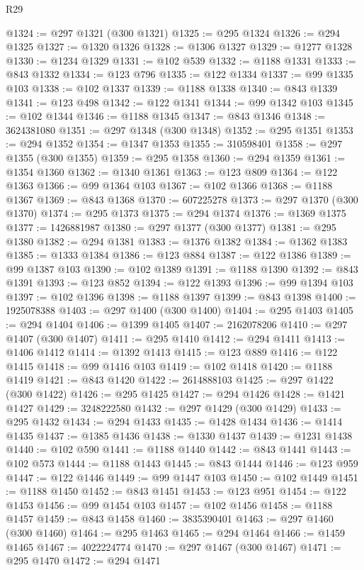 \begin{lexlean}{R29}
\begin{coremodule}
@1324 := @297 @1321 (@300 @1321)
@1325 := @295 @1324
@1326 := @294 @1325
@1327 := @1320 @1326
@1328 := @1306 @1327
@1329 := @1277 @1328
@1330 := @1234 @1329
@1331 := @102 @539
@1332 := @1188 @1331
@1333 := @843 @1332
@1334 := @123 @796
@1335 := @122 @1334
@1337 := @99 @1335 @103
@1338 := @102 @1337
@1339 := @1188 @1338
@1340 := @843 @1339
@1341 := @123 @498
@1342 := @122 @1341
@1344 := @99 @1342 @103
@1345 := @102 @1344
@1346 := @1188 @1345
@1347 := @843 @1346
@1348 := 3624381080
@1351 := @297 @1348 (@300 @1348)
@1352 := @295 @1351
@1353 := @294 @1352
@1354 := @1347 @1353
@1355 := 310598401
@1358 := @297 @1355 (@300 @1355)
@1359 := @295 @1358
@1360 := @294 @1359
@1361 := @1354 @1360
@1362 := @1340 @1361
@1363 := @123 @809
@1364 := @122 @1363
@1366 := @99 @1364 @103
@1367 := @102 @1366
@1368 := @1188 @1367
@1369 := @843 @1368
@1370 := 607225278
@1373 := @297 @1370 (@300 @1370)
@1374 := @295 @1373
@1375 := @294 @1374
@1376 := @1369 @1375
@1377 := 1426881987
@1380 := @297 @1377 (@300 @1377)
@1381 := @295 @1380
@1382 := @294 @1381
@1383 := @1376 @1382
@1384 := @1362 @1383
@1385 := @1333 @1384
@1386 := @123 @884
@1387 := @122 @1386
@1389 := @99 @1387 @103
@1390 := @102 @1389
@1391 := @1188 @1390
@1392 := @843 @1391
@1393 := @123 @852
@1394 := @122 @1393
@1396 := @99 @1394 @103
@1397 := @102 @1396
@1398 := @1188 @1397
@1399 := @843 @1398
@1400 := 1925078388
@1403 := @297 @1400 (@300 @1400)
@1404 := @295 @1403
@1405 := @294 @1404
@1406 := @1399 @1405
@1407 := 2162078206
@1410 := @297 @1407 (@300 @1407)
@1411 := @295 @1410
@1412 := @294 @1411
@1413 := @1406 @1412
@1414 := @1392 @1413
@1415 := @123 @889
@1416 := @122 @1415
@1418 := @99 @1416 @103
@1419 := @102 @1418
@1420 := @1188 @1419
@1421 := @843 @1420
@1422 := 2614888103
@1425 := @297 @1422 (@300 @1422)
@1426 := @295 @1425
@1427 := @294 @1426
@1428 := @1421 @1427
@1429 := 3248222580
@1432 := @297 @1429 (@300 @1429)
@1433 := @295 @1432
@1434 := @294 @1433
@1435 := @1428 @1434
@1436 := @1414 @1435
@1437 := @1385 @1436
@1438 := @1330 @1437
@1439 := @1231 @1438
@1440 := @102 @590
@1441 := @1188 @1440
@1442 := @843 @1441
@1443 := @102 @573
@1444 := @1188 @1443
@1445 := @843 @1444
@1446 := @123 @959
@1447 := @122 @1446
@1449 := @99 @1447 @103
@1450 := @102 @1449
@1451 := @1188 @1450
@1452 := @843 @1451
@1453 := @123 @951
@1454 := @122 @1453
@1456 := @99 @1454 @103
@1457 := @102 @1456
@1458 := @1188 @1457
@1459 := @843 @1458
@1460 := 3835390401
@1463 := @297 @1460 (@300 @1460)
@1464 := @295 @1463
@1465 := @294 @1464
@1466 := @1459 @1465
@1467 := 4022224774
@1470 := @297 @1467 (@300 @1467)
@1471 := @295 @1470
@1472 := @294 @1471

\end{coremodule}
\end{lexlean}
